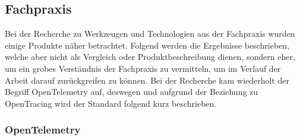 %
%

\subsection{Fachpraxis}

Bei der Recherche zu Werkzeugen und Technologien aus der Fachpraxis wurden einige Produkte näher betrachtet. Folgend werden die Ergebnisse beschrieben, welche aber nicht als Vergleich oder Produktbeschreibung dienen, sondern eher, um ein grobes Verständnis der Fachpraxis zu vermitteln, um im Verlauf der Arbeit darauf zurückgreifen zu können. Bei der Recherche kam wiederholt der Begriff OpenTelemetry auf, deswegen und aufgrund der Beziehung zu OpenTracing wird der Standard folgend kurz beschrieben.

\subsubsection{OpenTelemetry}

